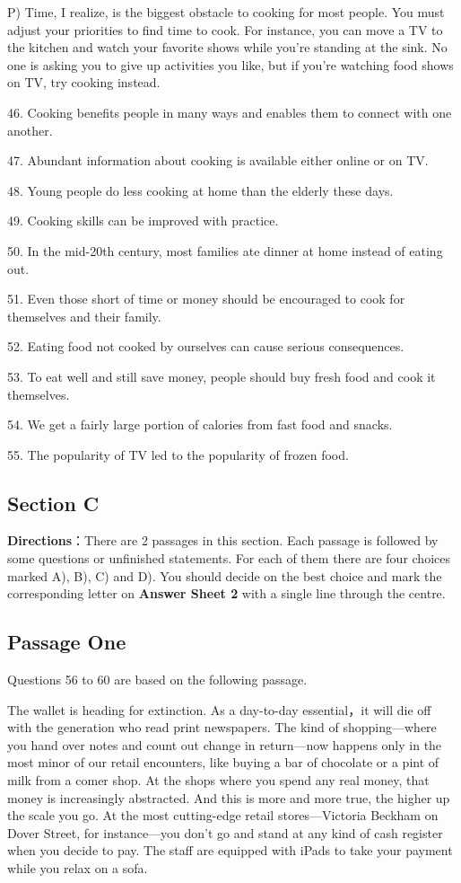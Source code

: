 \documentclass[UTF8,11pt]{ctexart}
\begin{document}
P) Time, I realize, is the biggest obstacle to cooking for most people. You must adjust your priorities to find time to cook. For instance, you can move a TV to the kitchen and watch your favorite shows while you’re standing at the sink. No one is asking you to give up activities you like, but if you’re watching food shows on TV, try cooking instead.


46. Cooking benefits people in many ways and enables them to connect with one another.


47. Abundant information about cooking is available either online or on TV.


48. Young people do less cooking at home than the elderly these days.


49. Cooking skills can be improved with practice.


50. In the mid-20th century, most families ate dinner at home instead of eating out.


51. Even those short of time or money should be encouraged to cook for themselves and their family.


52. Eating food not cooked by ourselves can cause serious consequences.


53. To eat well and still save money, people should buy fresh food and cook it themselves.


54. We get a fairly large portion of calories from fast food and snacks.


55. The popularity of TV led to the popularity of frozen food.


\subsection*{\textbf{Section C}}


\textbf{Directions}：There are 2 passages in this section. Each passage is followed by some questions or unfinished statements. For each of them there are four choices marked A), B), C) and D). You should decide on the best choice and mark the corresponding letter on\textbf{ Answer Sheet 2} with a single line through the centre.


\subsection*{Passage One}


Questions 56 to 60 are based on the following passage.


The wallet is heading for extinction. As a day-to-day essential，it will die off with the generation who read print newspapers. The kind of shopping—where you hand over notes and count out change in return—now happens only in the most minor of our retail encounters, like buying a bar of chocolate or a pint of milk from a comer shop. At the shops where you spend any real money, that money is increasingly abstracted. And this is more and more true, the higher up the scale you go. At the most cutting-edge retail stores—Victoria Beckham on Dover Street, for instance—you don’t go and stand at any kind of cash register when you decide to pay. The staff are equipped with iPads to take your payment while you relax on a sofa.
\end{document}
